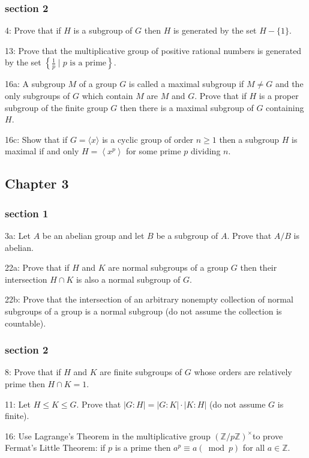 \documentclass{article}
\begin{document}
\subsubsection*{section 2}
4: Prove that if $H$ is a subgroup of $G$ then $H$ is generated by the set $H-\{1\}$.

13: Prove that the multiplicative group of positive rational numbers is generated by the set $\left\{\frac{1}{p} \mid \text{$p$ is a prime} \right\}$. 

16a: A subgroup $M$ of a group $G$ is called a maximal subgroup if $M \neq G$ and the only subgroups of $G$ which contain $M$ are $M$ and $G$. Prove that if $H$ is a proper subgroup of the finite group $G$ then there is a maximal subgroup of $G$ containing $H$.

16c: Show that if $G=\langle x\rangle$ is a cyclic group of order $n \geq 1$ then a subgroup $H$ is maximal if and only $H=\left\langle x^{p}\right\rangle$ for some prime $p$ dividing $n$.

\subsection*{Chapter 3}
\subsubsection*{section 1}
3a: Let $A$ be an abelian group and let $B$ be a subgroup of $A$. Prove that $A / B$ is abelian.

22a: Prove that if $H$ and $K$ are normal subgroups of a group $G$ then their intersection $H \cap K$ is also a normal subgroup of $G$.

22b: Prove that the intersection of an arbitrary nonempty collection of normal subgroups of a group is a normal subgroup (do not assume the collection is countable).

\subsubsection*{section 2}
8: Prove that if $H$ and $K$ are finite subgroups of $G$ whose orders are relatively prime then $H \cap K=1$.

11: Let $H \leq K \leq G$. Prove that $|G: H|=|G: K| \cdot|K: H|$ (do not assume $G$ is finite).

16: Use Lagrange's Theorem in the multiplicative group $(\mathbb{Z} / p \mathbb{Z})^{\times}$to prove Fermat's Little Theorem: if $p$ is a prime then $a^{p} \equiv a(\bmod p)$ for all $a \in \mathbb{Z}$.
\end{document}
